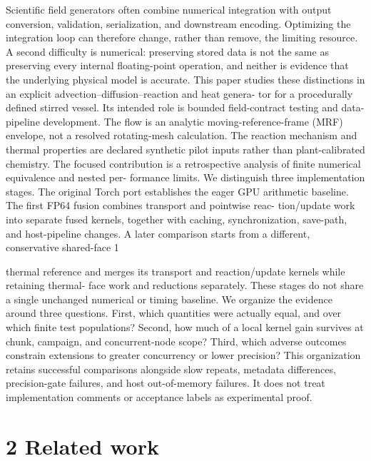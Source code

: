 \documentclass[11pt]{article}
\begin{document}
Scientific field generators often combine numerical integration with output conversion, validation,
serialization, and downstream encoding. Optimizing the integration loop can therefore change,
rather than remove, the limiting resource. A second difficulty is numerical: preserving stored data
is not the same as preserving every internal floating-point operation, and neither is evidence that
the underlying physical model is accurate.
This paper studies these distinctions in an explicit advection–diffusion–reaction and heat genera-
tor for a procedurally defined stirred vessel. Its intended role is bounded field-contract testing and
data-pipeline development. The flow is an analytic moving-reference-frame (MRF) envelope, not a
resolved rotating-mesh calculation. The reaction mechanism and thermal properties are declared
synthetic pilot inputs rather than plant-calibrated chemistry.
The focused contribution is a retrospective analysis of finite numerical equivalence and nested per-
formance limits. We distinguish three implementation stages. The original Torch port establishes
the eager GPU arithmetic baseline. The first FP64 fusion combines transport and pointwise reac-
tion/update work into separate fused kernels, together with caching, synchronization, save-path,
and host-pipeline changes. A later comparison starts from a different, conservative shared-face
1

thermal reference and merges its transport and reaction/update kernels while retaining thermal-
face work and reductions separately. These stages do not share a single unchanged numerical or
timing baseline.
We organize the evidence around three questions. First, which quantities were actually equal,
and over which finite test populations? Second, how much of a local kernel gain survives at chunk,
campaign, and concurrent-node scope? Third, which adverse outcomes constrain extensions to
greater concurrency or lower precision? This organization retains successful comparisons alongside
slow repeats, metadata differences, precision-gate failures, and host out-of-memory failures. It does
not treat implementation comments or acceptance labels as experimental proof.

\section*{2 Related work}
\end{document}
